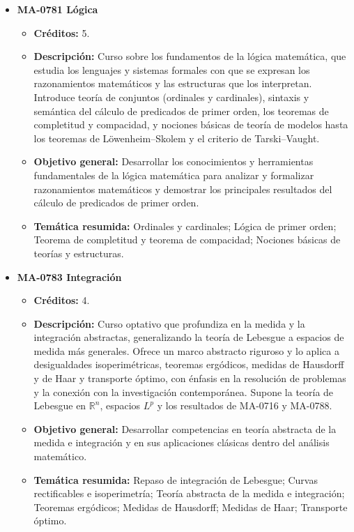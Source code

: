 \begin{itemize}[leftmargin=1.3em, itemsep=10pt, topsep=4pt, label={\color{Azul-UCR}$\blacksquare$}]
\item {\color{Azul-UCR}\textbf{MA-0781 Lógica}}\par\nopagebreak\smallskip
\begin{itemize}[leftmargin=1.1em, itemsep=3pt, topsep=2pt, parsep=2pt, label={\textendash}]
\item \textbf{Créditos:} 5.
\item \textbf{Descripción:} Curso sobre los fundamentos de la lógica matemática, que estudia los lenguajes y sistemas formales con que se expresan los razonamientos matemáticos y las estructuras que los interpretan. Introduce teoría de conjuntos (ordinales y cardinales), sintaxis y semántica del cálculo de predicados de primer orden, los teoremas de completitud y compacidad, y nociones básicas de teoría de modelos hasta los teoremas de Löwenheim--Skolem y el criterio de Tarski--Vaught.
\item \textbf{Objetivo general:} Desarrollar los conocimientos y herramientas fundamentales de la lógica matemática para analizar y formalizar razonamientos matemáticos y demostrar los principales resultados del cálculo de predicados de primer orden.
\item \textbf{Temática resumida:} Ordinales y cardinales; Lógica de primer orden; Teorema de completitud y teorema de compacidad; Nociones básicas de teorías y estructuras.
\end{itemize}

\item {\color{Azul-UCR}\textbf{MA-0783 Integración}}\par\nopagebreak\smallskip
\begin{itemize}[leftmargin=1.1em, itemsep=3pt, topsep=2pt, parsep=2pt, label={\textendash}]
\item \textbf{Créditos:} 4.
\item \textbf{Descripción:} Curso optativo que profundiza en la medida y la integración abstractas, generalizando la teoría de Lebesgue a espacios de medida más generales. Ofrece un marco abstracto riguroso y lo aplica a desigualdades isoperimétricas, teoremas ergódicos, medidas de Hausdorff y de Haar y transporte óptimo, con énfasis en la resolución de problemas y la conexión con la investigación contemporánea. Supone la teoría de Lebesgue en $\mathbb{R}^n$, espacios $L^p$ y los resultados de MA-0716 y MA-0788.
\item \textbf{Objetivo general:} Desarrollar competencias en teoría abstracta de la medida e integración y en sus aplicaciones clásicas dentro del análisis matemático.
\item \textbf{Temática resumida:} Repaso de integración de Lebesgue; Curvas rectificables e isoperimetría; Teoría abstracta de la medida e integración; Teoremas ergódicos; Medidas de Hausdorff; Medidas de Haar; Transporte óptimo.
\end{itemize}


\end{itemize}
